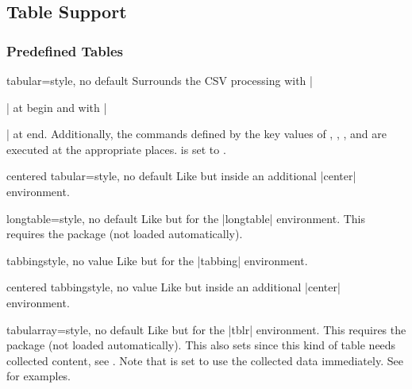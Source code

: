 \documentclass[a4paper,11pt]{ltxdoc}
\begin{document}
\clearpage
\subsection{Table Support}\label{subsec:tabsupport}%

\subsubsection{Predefined Tables}\label{subsubsec:table_predef}

\begin{docCsvKey}{tabular}{=}{style, no default}
  Surrounds the CSV processing with |\begin{tabular}|
  at begin and with |\end{tabular}| at end.
  Additionally, the commands defined by the key values of
  , , ,
  and  are executed at the appropriate places.
   is set to \cs{}\cs{}.
\end{docCsvKey}


\begin{docCsvKey}{centered tabular}{=}{style, no default}
  Like  but inside an additional |center| environment.
\end{docCsvKey}


\begin{docCsvKey}{longtable}{=}{style, no default}
  Like  but for the |longtable| environment.
  This requires the package  (not loaded automatically).
\end{docCsvKey}


\begin{docCsvKey}{tabbing}{}{style, no value}
  Like  but for the |tabbing| environment.
\end{docCsvKey}


\begin{docCsvKey}{centered tabbing}{}{style, no value}
  Like  but inside an additional |center| environment.
\end{docCsvKey}


\begin{docCsvKey}[][doc new=2021-07-06]{tabularray}{=}{style, no default}
  Like  but for the |tblr| environment.
  This requires the package  (not loaded automatically).
  This also sets  since this kind of table
  needs collected content, see .
  Note that  is set to use the collected
  data immediately. See  for examples.
\end{docCsvKey}
\end{document}
